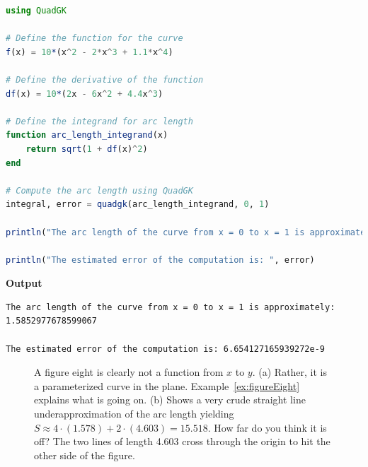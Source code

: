 \begin{lstlisting}[language=Julia,style=mystyle]
using QuadGK

# Define the function for the curve
f(x) = 10*(x^2 - 2*x^3 + 1.1*x^4)

# Define the derivative of the function
df(x) = 10*(2x - 6x^2 + 4.4x^3)

# Define the integrand for arc length
function arc_length_integrand(x)
    return sqrt(1 + df(x)^2)
end

# Compute the arc length using QuadGK
integral, error = quadgk(arc_length_integrand, 0, 1)

println("The arc length of the curve from x = 0 to x = 1 is approximately: ", integral)

println("The estimated error of the computation is: ", error)
\end{lstlisting}
\textbf{Output} 
\begin{verbatim}
The arc length of the curve from x = 0 to x = 1 is approximately: 1.5852977678599067

The estimated error of the computation is: 6.654127165939272e-9
\end{verbatim}
\Qed

\bigskip

\begin{figure}[htb]%
\centering
\hfill%
%
\hfill%
%
\hfill
\caption[]{A figure eight is clearly not a function from $x$ to $y$. (a) Rather, it is a parameterized curve in the plane. Example~\ref{ex:figureEight} explains what is going on. (b) Shows a very crude straight line underapproximation of the arc length yielding $S \approx 4 \cdot (1.578) + 2 \cdot(4.603) = 15.518$. How far do you think it is off? The two lines of length 4.603 cross through the origin to hit the other side of the figure.}
    \label{fig:figureEightPathLength}
\end{figure}

